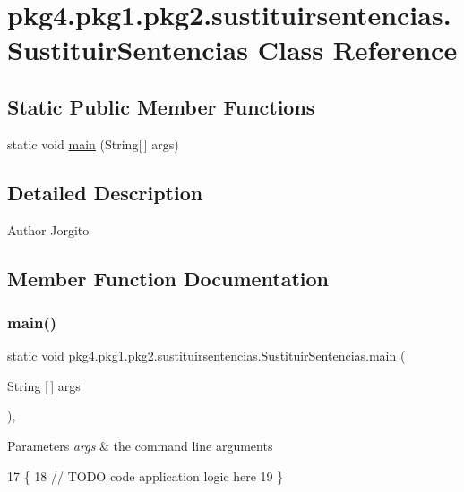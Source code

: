 \hypertarget{classpkg4_1_1pkg1_1_1pkg2_1_1sustituirsentencias_1_1_sustituir_sentencias}{}\section{pkg4.\+pkg1.\+pkg2.\+sustituirsentencias.\+Sustituir\+Sentencias Class Reference}
\label{classpkg4_1_1pkg1_1_1pkg2_1_1sustituirsentencias_1_1_sustituir_sentencias}
\subsection*{Static Public Member Functions}
\begin{DoxyCompactItemize}
\item 
static void \mbox{\hyperlink{classpkg4_1_1pkg1_1_1pkg2_1_1sustituirsentencias_1_1_sustituir_sentencias_a47ef8adf0b9547299bb4519b242c40db}{main}} (String\mbox{[}$\,$\mbox{]} args)
\end{DoxyCompactItemize}


\subsection{Detailed Description}
\begin{DoxyAuthor}{Author}
Jorgito 
\end{DoxyAuthor}


\subsection{Member Function Documentation}
\mbox{\label{classpkg4_1_1pkg1_1_1pkg2_1_1sustituirsentencias_1_1_sustituir_sentencias_a47ef8adf0b9547299bb4519b242c40db}} 
\subsubsection{\texorpdfstring{main()}{main()}}
{\footnotesize\ttfamily static void pkg4.\+pkg1.\+pkg2.\+sustituirsentencias.\+Sustituir\+Sentencias.\+main (\begin{DoxyParamCaption}\item[{String \mbox{[}$\,$\mbox{]}}]{args }\end{DoxyParamCaption})\hspace{0.3cm}{\ttfamily [inline]}, {\ttfamily [static]}}


\begin{DoxyParams}{Parameters}
{\em args} & the command line arguments \\
\hline
\end{DoxyParams}

\begin{DoxyCode}
17                                            \{
18         \textcolor{comment}{// TODO code application logic here}
19     \}
\end{DoxyCode}
